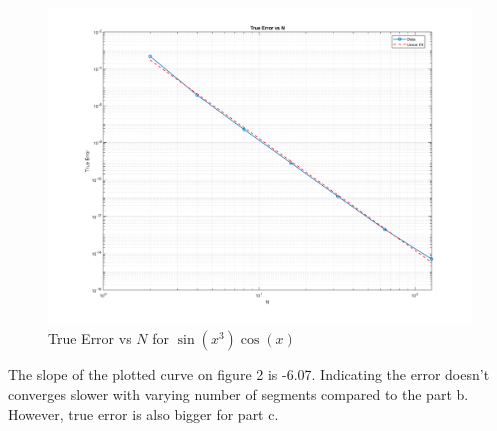 \begin{figure}[h]
    \centering
    \includegraphics[width=1\textwidth]{Q2-plot2.png}
    \caption{True Error vs $N$ for $\sin(x^3) \cos(x)$}
    \label{fig:sinx3cosx}
\end{figure}

The slope of the plotted curve on figure 2 is -6.07. Indicating the error doesn't converges slower with varying number of segments compared to the part b. However, true error is also bigger for part c.


